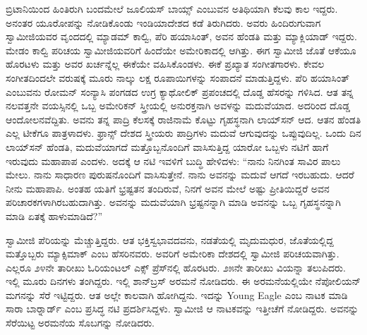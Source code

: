  ಬ್ರಿಟಾನಿಯಿಂದ ಹಿಂತಿರುಗಿ ಬಂದಮೇಲೆ ಜೂಲಿಯಸ್ ಬಾಯ್ಸ್ ಎಂಬುವನ ಅತಿಥಿಯಾಗಿ ಕೆಲವು ಕಾಲ ಇದ್ದರು. ಅನಂತರ ಯೂರೋಪನ್ನು ನೋಡಿಕೊಂಡು ಇಂಡಿಯಾದೇಶದ ಕಡೆ ತಿರುಗಿದರು. ಅವರು ಹಿಂದಿರುಗುವಾಗ ಸ್ವಾಮೀಜಿಯವರ ವೃಂದದಲ್ಲಿ ಮ್ಯಾಡಮ್ ಕಾಲ್ವಿ, ಪೆರಿ ಹಯಾಸಿಂತ್, ಅವನ ಹೆಂಡತಿ ಮತ್ತು ಮ್ಯಾಕ್ಲಿಯಾಡ್ ಇದ್ದರು. ಮೇಡಂ ಕಾಲ್ವಿ ಪರಿಚಯ ಸ್ವಾಮೀಜಿಯವರಿಗೆ ಹಿಂದೆಯೇ ಅಮೇರಿಕಾದಲ್ಲಿ ಆಗಿತ್ತು. ಈಗ ಸ್ವಾಮೀಜಿ ಜೊತೆ ಆಕೆಯೂ ಹೊರಟಳು ಮತ್ತು ಅವರ ಖರ್ಚನ್ನೆಲ್ಲ ಈಕೆಯೇ ವಹಿಸಿಕೊಂಡಳು. ಈಕೆ ಪ್ರಖ್ಯಾತ ಸಂಗೀತಗಾರಳು. ಕೇವಲ ಸಂಗೀತದಿಂದಲೇ ವರುಷಕ್ಕೆ ಮೂರು ನಾಲ್ಕು ಲಕ್ಷ ರೂಪಾಯಿಗಳನ್ನು ಸಂಪಾದನೆ ಮಾಡುತ್ತಿದ್ದಳು. ಪೆರಿ ಹಯಾಸಿಂತ್ ಎಂಬುವನು ರೋಮನ್ ಸಂನ್ಯಾಸಿ ಪಂಗಡದ ಉಗ್ರ ಕ್ಯಾಥೋಲಿಕ್ ಪ್ರಪಂಚದಲ್ಲಿ ದೊಡ್ಡ ಹೆಸರನ್ನು ಗಳಿಸಿದ. ಆತ ತನ್ನ ನಲವತ್ತನೇ ವಯಸ್ಸಿನಲ್ಲಿ ಒಬ್ಬ ಅಮೇರಿಕನ್ ಸ್ತ್ರೀಯಲ್ಲಿ ಅನುರಕ್ತನಾಗಿ ಅವಳನ್ನು ಮದುವೆಯಾದ. ಅದರಿಂದ ದೊಡ್ಡ ಆಂದೋಲನವೆದ್ದಿತು. ಅವನು ತನ್ನ ಪಾದ್ರಿ ಕೆಲಸಕ್ಕೆ ರಾಜಿನಾಮೆ ಕೊಟ್ಟು ಗೃಹಸ್ಥನಾಗಿ ಲಾಯ್​ಸನ್ ಆದ. ಆತನ ಹೆಂಡತಿ ಎಲ್ಲ ಟೀಕೆಗೂ ಪಾತ್ರಳಾದಳು. ಫ್ರಾನ್ಸ್ ದೇಶದ ಸ್ತ್ರೀಯರು ಪಾದ್ರಿಗಳು ಮದುವೆ ಆಗುವುದನ್ನು ಒಪ್ಪುವುದಿಲ್ಲ. ಒಂದು ದಿನ ಲಾಯ್​ಸನ್ ಹೆಂಡತಿ, ಮದುವೆಯಾಗದೆ ಮತ್ತೊಬ್ಬನೊಂದಿಗೆ ವಾಸಿಸುತ್ತಿದ್ದ ಯಾರೋ ಒಬ್ಬಳು ನಟಿಗೆ ಹಾಗೆ ಇರುವುದು ಮಹಾಪಾಪ ಎಂದಳು. ಅದಕ್ಕೆ ಆ ನಟಿ ಇವಳಿಗೆ ಬುದ್ಧಿ ಹೇಳಿದಳು: “ನಾನು ನಿನಗಿಂತ ಸಾವಿರ ಪಾಲು ಮೇಲು. ನಾನು ಸಾಧಾರಣ ಪುರುಷನೊಂದಿಗೆ ವಾಸಿಸುತ್ತೇನೆ. ನಾನು ಅವನನ್ನು ಮದುವೆ ಆಗದೆ ಇರಬಹುದು. ಆದರೆ ನೀನು ಮಹಾಪಾಪಿ. ಅಂತಹ ಯತಿಗೆ ಭ್ರಷ್ಟತನ ತಂದಿರುವೆ, ನಿನಗೆ ಅವನ ಮೇಲೆ ಅಷ್ಟು ಪ್ರೀತಿಯಿದ್ದರೆ ಅವನ ಪರಿಚಾರಕಗಳಾಗಿರಬಹುದಾಗಿತ್ತು. ಅವನನ್ನು ಮದುವೆಯಾಗಿ ಭ್ರಷ್ಟನನ್ನಾಗಿ ಮಾಡಿ ಅವನನ್ನು ಒಬ್ಬ ಗೃಹಸ್ಥನನ್ನಾಗಿ ಮಾಡಿ ಏತಕ್ಕೆ ಹಾಳುಮಾಡಿದೆ?” 

\vskip 1pt

 ಸ್ವಾಮೀಜಿ ಪೆರಿಯನ್ನು ಮೆಚ್ಚುತ್ತಿದ್ದರು. ಆತ ಭಕ್ತಿಸ್ವಭಾವದವನು, ನಡತೆಯಲ್ಲಿ ಮೃದುಮಧುರ, ಜೊತೆಯಲ್ಲಿದ್ದ ಮತ್ತೊಬ್ಬರು ಮ್ಯಾಕ್ಸಿಮಾಕ್ ಎಂಬ ಹೆಸರಿನವರು. ಅವರಿಗೆ ಅಮೇರಿಕಾ ದೇಶದಲ್ಲಿ ಸ್ವಾಮೀಜಿ ಪರಿಚಯವಾಗಿತ್ತು. ಎಲ್ಲರೂ ೨೪ನೇ ತಾರೀಖು ಓರಿಯಂಟಲ್ ಎಕ್ಸ್ ಪ್ರೆಸ್‍ನಲ್ಲಿ ಹೊರಟರು. ೨೫ನೇ ತಾರೀಖು ವಿಯನ್ನಾ ತಲುಪಿದರು. ಇಲ್ಲಿ ಮೂರು ದಿನಗಳು ತಂಗಿದ್ದರು. ಇಲ್ಲಿ ಶಾನ್‍ಬ್ರಸ್ ಅರಮನೆ ನೋಡಿದರು. ಈ ಅರಮನೆಯಲ್ಲಿಯೇ ನೆಪೋಲಿಯನ್ ಮಗನನ್ನು ಸೆರೆ ಇಟ್ಟಿದ್ದರು. ಆತ ಅಲ್ಲೇ ಕಾಲವಾಗಿ ಹೋಗಿದ್ದನು. ಇದನ್ನು Young Eagle ಎಂಬ ನಾಟಕ ಮಾಡಿ ಸಾರಾ ಬಾರ್‍ನಾರ್ಡ್ ಎಂಬ ಪ್ರಸಿದ್ಧ ನಟಿ ಪ್ರದರ್ಶಿಸಿದ್ದಳು. ಸ್ವಾಮೀಜಿ ಆ ನಾಟಕವನ್ನು ಇತ್ತೀಚೆಗೆ ನೋಡಿದ್ದರು. ಅವನನ್ನು ಸೆರೆಯಿಟ್ಟ ಅರಮನೆಯ ಸೊಬಗನ್ನು ನೋಡಿದರು. 

\vskip 1pt

